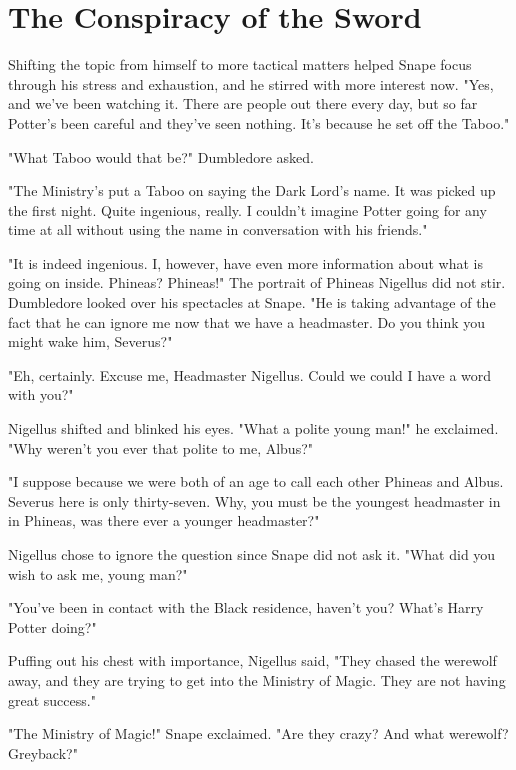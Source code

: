
\chapter{The Conspiracy of the Sword}

Shifting the topic from himself to more tactical matters helped Snape focus through his stress and exhaustion, and he stirred with more interest now. "Yes, and we've been watching it. There are people out there every day, but so far Potter's been careful and they've seen nothing. It's because he set off the Taboo."

"What Taboo would that be?" Dumbledore asked.

"The Ministry's put a Taboo on saying the Dark Lord's name. It was picked up the first night. Quite ingenious, really. I couldn't imagine Potter going for any time at all without using the name in conversation with his friends."

"It is indeed ingenious. I, however, have even more information about what is going on inside. Phineas? Phineas!" The portrait of Phineas Nigellus did not stir. Dumbledore looked over his spectacles at Snape. "He is taking advantage of the fact that he can ignore me now that we have a headmaster. Do you think you might wake him, Severus?"

"Eh, certainly. Excuse me, Headmaster Nigellus. Could we{\el} could I have a word with you?"

Nigellus shifted and blinked his eyes. "What a polite young man!" he exclaimed. "Why weren't you ever that polite to me, Albus?"

"I suppose because we were both of an age to call each other Phineas and Albus. Severus here is only thirty-seven. Why, you must be the youngest headmaster in{\el} in{\el} Phineas, was there ever a younger headmaster?"

Nigellus chose to ignore the question since Snape did not ask it. "What did you wish to ask me, young man?"

"You've been in contact with the Black residence, haven't you? What's Harry Potter doing?"

Puffing out his chest with importance, Nigellus said, "They chased the werewolf away, and they are trying to get into the Ministry of Magic. They are not having great success."

"The Ministry of Magic!" Snape exclaimed. "Are they crazy? And what werewolf? Greyback?"

